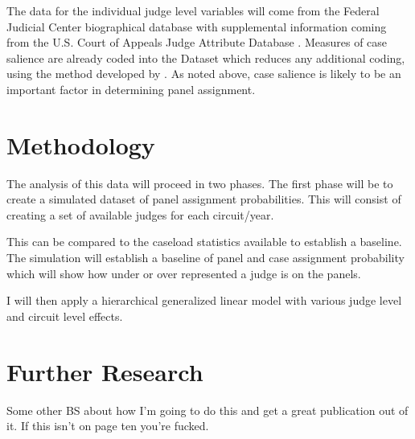 \documentclass[12pt]{article}
\begin{document}
The data for the individual judge level variables will come from the Federal Judicial Center biographical database with supplemental information coming from the U.S. Court of Appeals Judge Attribute Database \citep{FJC}. Measures of case salience are already coded into the \citeauthor{Songer2007} Dataset which reduces any additional coding, using the method developed by \cite{Hettinger2003}.  As noted above, case salience is likely to be an important factor in determining panel assignment.

\section{Methodology}\label{Methods}
The analysis of this data will proceed in two phases. The first phase will be to create a simulated dataset of panel assignment probabilities. This will consist of creating a set of available judges for each circuit/year. 

This can be compared to the caseload statistics available to establish a baseline. The simulation will establish a baseline of panel and case assignment probability which will show how under or over represented a judge is on the panels. 

I will then apply a hierarchical generalized linear model with various judge level and circuit level effects.

\section{Further Research}\label{Further Research}
Some other BS about how I'm going to do this and get a great publication out of it. If this isn't on page ten you're fucked.




\end{document}
